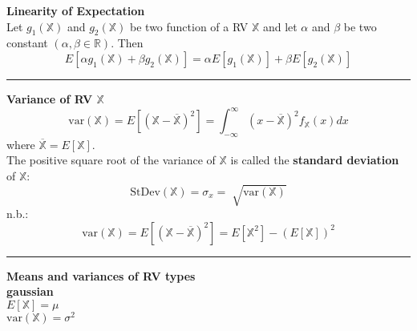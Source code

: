 \documentclass{article}
\providecommand{\X}{\mathbb{X}}
\providecommand{\R}{\mathbb{R}}
\begin{document}
\begin{multicols*}{3}
        \textbf{Linearity of Expectation}\\
        Let $g_1(\X)$ and $g_2(\X)$ be two function of a RV $\X$ and let $\alpha$ and $\beta$ be two constant $(\alpha, \beta\in\R)$.
        Then
        \begin{equation*}
            E[\alpha g_1(\X) + \beta g_2(\X)] = \alpha E[g_1(\X)] + \beta E[g_2(\X)]
        \end{equation*}

        \noindent\rule{\columnwidth}{0.4pt}

        \textbf{Variance of RV $\X$}
        \begin{equation*}
            \text{var}(\X) = E[(\X - \overline{\X})^2] = \int_{-\infty}^{\infty}(x-\overline{\X})^2 f_\X(x)dx
        \end{equation*}
        where $\overline{\X} = E[\X]$.\\
        The positive square root of the variance of $\X$ is called the \textbf{standard deviation} of $\X$:
        \begin{equation*}
            \text{StDev}(\X) = \sigma_x = \sqrt[]{\text{var}(\X)}
        \end{equation*}
        n.b.:
        \begin{equation*}
            \text{var}(\X) = E[(\X - \overline{\X})^2] = E[\X^2] - (E[\X])^2
        \end{equation*}

        \noindent\rule{\columnwidth}{0.4pt}

        \textbf{Means and variances of RV types}\\
        \textbf{gaussian}\\
        $E[\X] = \mu$\\
        $\text{var}(\X) = \sigma^2$

    \end{multicols*}
\end{document}
